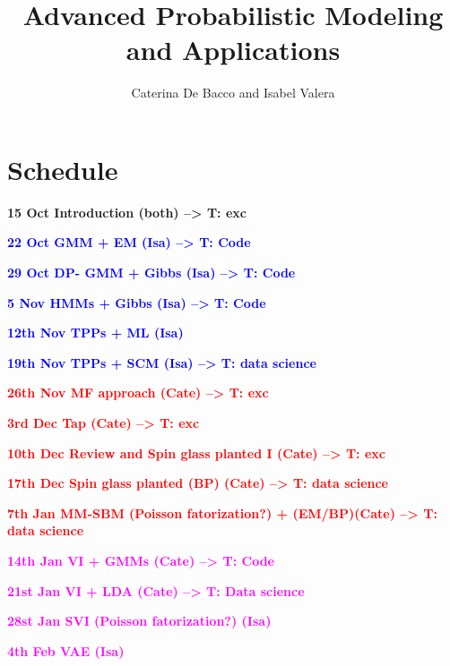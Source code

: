





\newcommand{\CDB}[1]{\textcolor{blue}{#1}}
\newcommand{\CDBcom}[1]{[\textcolor{blue}{CDB: #1}]}
\newcommand{\IV}[1]{\textcolor{red}{#1}}
\newcommand{\IVcom}[1]{[\textcolor{red}{DL: #1}]}
\newcommand{\nix}[1]{\textcolor{red}{#1}}


\title{Advanced Probabilistic Modeling and Applications}
\author{Caterina De Bacco and Isabel Valera}
\date{\null}


\maketitle

%

\section{Schedule}

\begin{itemize}
\item \bf{15 Oct} Introduction  (both) --> T: exc
\CDB{
\item \bf{22 Oct} GMM + EM (Isa) --> T: Code
\item \bf{29 Oct} DP- GMM + Gibbs (Isa) --> T: Code
\item \bf{5 Nov} HMMs + Gibbs (Isa) --> T: Code 
\item \bf{12th Nov} TPPs + ML (Isa) 
\item \bf{19th Nov} TPPs + SCM (Isa)  --> T: data science
}
\IV{
\item \bf{26th Nov} MF approach (Cate) --> T: exc
\item \bf{3rd Dec} Tap (Cate) --> T: exc
\item \bf{10th Dec}  Review and Spin glass planted  I (Cate) --> T: exc
\item \bf{17th Dec} Spin glass planted (BP) (Cate) --> T: data science
\item \bf{7th Jan}  MM-SBM  (Poisson fatorization?) + (EM/BP)(Cate)  --> T: data science
}
\textcolor{magenta}{
\item \bf{14th Jan} VI + GMMs (Cate)  --> T: Code
\item \bf{21st Jan}  VI + LDA (Cate) --> T: Data science
\item \bf{28st Jan} SVI (Poisson fatorization?) (Isa) 
\item \bf{4th Feb} VAE (Isa) 
}
\end{itemize}






%




